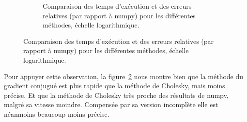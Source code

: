 \documentclass{article}
\begin{document}
\begin{figure}[H]
\begin{minipage}{0.65\textwidth}
    \begin{figure}[H]
      \begin{center}
        \caption{Comparaison des temps d'exécution et des erreurs relatives (par rapport à numpy) pour les différentes méthodes, échelle logarithmique.}
        \label{fig:comparaion_chaleur}
      \end{center}
    \end{figure}
  \end{minipage}
\end{figure}

Pour appuyer cette observation, la figure~\ref{fig:comparaion_chaleur} nous montre bien que la méthode du gradient conjugué est plus rapide que la méthode de Cholesky, mais moins précise. Et que la méthode de Cholesky très proche des résultats de numpy, malgré sa vitesse moindre. Compensée par sa version incomplète elle est néanmoins beaucoup moins précise.
\end{document}
